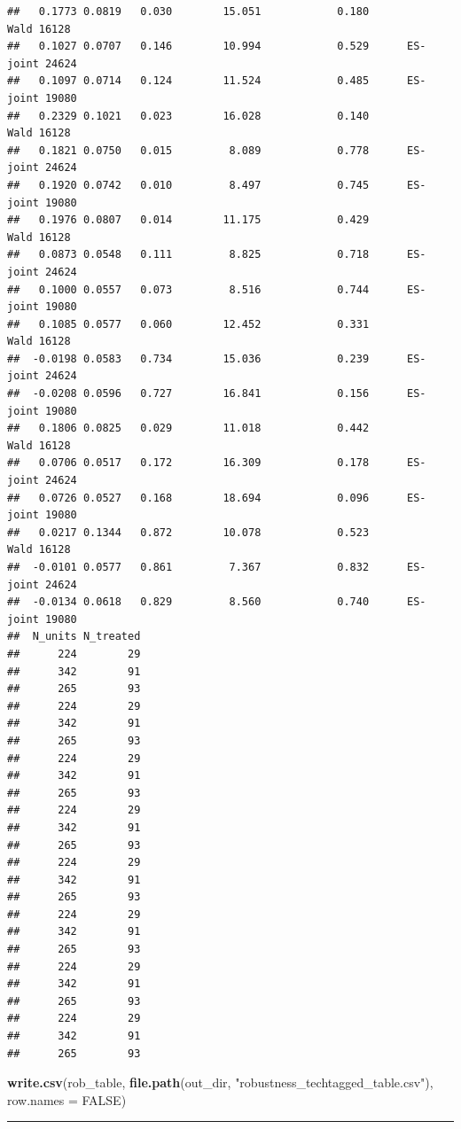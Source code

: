 \documentclass[
]{article}
\newenvironment{Shaded}{\begin{snugshade}}{\end{snugshade}}
\newcommand{\AttributeTok}[1]{\textcolor[rgb]{0.13,0.29,0.53}{#1}}
\newcommand{\ConstantTok}[1]{\textcolor[rgb]{0.56,0.35,0.01}{#1}}
\newcommand{\FunctionTok}[1]{\textcolor[rgb]{0.13,0.29,0.53}{\textbf{#1}}}
\newcommand{\NormalTok}[1]{#1}
\newcommand{\StringTok}[1]{\textcolor[rgb]{0.31,0.60,0.02}{#1}}
\begin{document}
\begin{verbatim}
##   0.1773 0.0819   0.030        15.051            0.180          Wald 16128
##   0.1027 0.0707   0.146        10.994            0.529      ES-joint 24624
##   0.1097 0.0714   0.124        11.524            0.485      ES-joint 19080
##   0.2329 0.1021   0.023        16.028            0.140          Wald 16128
##   0.1821 0.0750   0.015         8.089            0.778      ES-joint 24624
##   0.1920 0.0742   0.010         8.497            0.745      ES-joint 19080
##   0.1976 0.0807   0.014        11.175            0.429          Wald 16128
##   0.0873 0.0548   0.111         8.825            0.718      ES-joint 24624
##   0.1000 0.0557   0.073         8.516            0.744      ES-joint 19080
##   0.1085 0.0577   0.060        12.452            0.331          Wald 16128
##  -0.0198 0.0583   0.734        15.036            0.239      ES-joint 24624
##  -0.0208 0.0596   0.727        16.841            0.156      ES-joint 19080
##   0.1806 0.0825   0.029        11.018            0.442          Wald 16128
##   0.0706 0.0517   0.172        16.309            0.178      ES-joint 24624
##   0.0726 0.0527   0.168        18.694            0.096      ES-joint 19080
##   0.0217 0.1344   0.872        10.078            0.523          Wald 16128
##  -0.0101 0.0577   0.861         7.367            0.832      ES-joint 24624
##  -0.0134 0.0618   0.829         8.560            0.740      ES-joint 19080
##  N_units N_treated
##      224        29
##      342        91
##      265        93
##      224        29
##      342        91
##      265        93
##      224        29
##      342        91
##      265        93
##      224        29
##      342        91
##      265        93
##      224        29
##      342        91
##      265        93
##      224        29
##      342        91
##      265        93
##      224        29
##      342        91
##      265        93
##      224        29
##      342        91
##      265        93
\end{verbatim}

\begin{Shaded}
\begin{Highlighting}[]
\FunctionTok{write.csv}\NormalTok{(rob\_table,}
          \FunctionTok{file.path}\NormalTok{(out\_dir, }\StringTok{"robustness\_techtagged\_table.csv"}\NormalTok{), }\AttributeTok{row.names =} \ConstantTok{FALSE}\NormalTok{)}
\end{Highlighting}
\end{Shaded}

\begin{center}\rule{0.5\linewidth}{0.5pt}\end{center}
\end{document}
